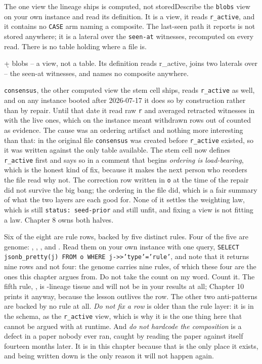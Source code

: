 \begin{Correspondence}{The one view the lineage ships is computed, not stored}{Describe the \texttt{blobs} view on your own instance and read its definition.}
It is a view, it reads \texttt{r\_active}, and it contains no \texttt{CASE} arm naming a composite. The last-seen path it reports is not stored anywhere; it is a lateral over the \texttt{seen-at} witnesses, recomputed on every read. There is no table holding where a file is.
\begin{Check}
\d+ blobs
-- a view, not a table. Its definition reads r_active, joins two laterals over
-- the seen-at witnesses, and names no composite anywhere.
\end{Check}
\texttt{consensus}, the other computed view the stem cell ships, reads \texttt{r\_active} as well, and on any instance booted after 2026-07-17 it does so by construction rather than by repair. Until that date it read raw \texttt{r} and averaged retracted witnesses in with the live ones, which on the \labLineageName{} instance meant \labLineageRetracted{} withdrawn rows out of \labLineageRelations{} counted as evidence. The cause was an ordering artifact and nothing more interesting than that: in the original file \texttt{consensus} was created before \texttt{r\_active} existed, so it was written against the only table available. The stem cell now defines \texttt{r\_active} first and says so in a comment that begins \textit{ordering is load-bearing}, which is the honest kind of fix, because it makes the next person who reorders the file read why not. The correction row written in \texttt{o} at the time of the repair did not survive the big bang; the ordering in the file did, which is a fair summary of what the two layers are each good for. None of it settles the weighting law, which is still \texttt{status: seed-prior} and still unfit, and fixing a view is not fitting a law. Chapter 8 owns both halves.
\end{Correspondence}

\bigskip

Six of the eight are rule rows, backed by five distinct rules. Four of the five are genome: , , , and . Read them on your own instance with one query, \texttt{SELECT jsonb\_pretty(j) FROM o WHERE j->>'type'='rule'}, and note that it returns nine rows and not four: the genome carries nine rules, of which these four are the ones this chapter argues from. Do not take the count on my word. Count it. The fifth rule, , is \labLineageMedium{}-lineage tissue and will not be in your results at all; Chapter 10 prints it anyway, because the lesson outlives the row. The other two anti-patterns are backed by no rule at all. \textit{Do not fix a row} is older than the rule layer: it is in the schema, as the \texttt{r\_active} view, which is why it is the one thing here that cannot be argued with at runtime. And \textit{do not hardcode the composition} is a defect in a paper nobody ever ran, caught by reading the paper against itself fourteen months later. It is in this chapter because that is the only place it exists, and being written down is the only reason it will not happen again.
